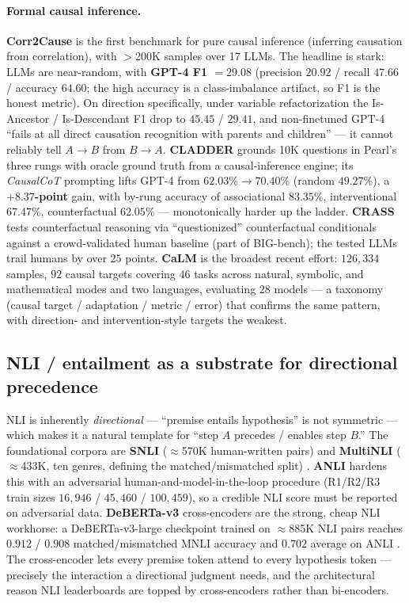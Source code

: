 \paragraph{Formal causal inference.}
\textbf{Corr2Cause} \citep{caus:jin2024corr2cause} is the first benchmark for
pure causal inference (inferring causation from correlation), with $>$200K
samples over 17 LLMs. The headline is stark: LLMs are near-random, with
\textbf{GPT-4 F1 $=29.08$} (precision $20.92$ / recall $47.66$ / accuracy
$64.60$; the high accuracy is a class-imbalance artifact, so F1 is the honest
metric). On direction specifically, under variable refactorization the
Is-Ancestor / Is-Descendant F1 drop to $45.45$ / $29.41$, and non-finetuned GPT-4
``fails at all direct causation recognition with parents and children'' --- it
cannot reliably tell $A\to B$ from $B\to A$. \textbf{CLADDER}
\citep{caus:jin2023cladder} grounds 10K questions in Pearl's three rungs with
oracle ground truth from a causal-inference engine; its \emph{CausalCoT}
prompting lifts GPT-4 from $62.03\%\to70.40\%$ (random $49.27\%$), a
\textbf{$+8.37$-point} gain, with by-rung accuracy of associational $83.35\%$,
interventional $67.47\%$, counterfactual $62.05\%$ --- monotonically harder up
the ladder. \textbf{CRASS} \citep{caus:frohberg2022crass} tests counterfactual
reasoning via ``questionized'' counterfactual conditionals against a
crowd-validated human baseline (part of BIG-bench); the tested LLMs trail humans
by over $25$ points. \textbf{CaLM} \citep{caus:chen2024calm} is the broadest
recent effort: $126{,}334$ samples, $92$ causal targets covering $46$ tasks
across natural, symbolic, and mathematical modes and two languages, evaluating
$28$ models --- a taxonomy (causal target / adaptation / metric / error) that
confirms the same pattern, with direction- and intervention-style targets the
weakest.

\subsection{NLI / entailment as a substrate for directional precedence}
\label{sec:nli}

NLI is inherently \emph{directional} --- ``premise entails hypothesis'' is not
symmetric --- which makes it a natural template for ``step $A$ precedes /
enables step $B$.'' The foundational corpora are \textbf{SNLI} ($\approx$570K
human-written pairs) \citep{found:bowman2015snli} and \textbf{MultiNLI} ($\approx$433K,
ten genres, defining the matched/mismatched split) \citep{found:williams2018mnli}.
\textbf{ANLI} \citep{caus:nie2020anli} hardens this with an adversarial
human-and-model-in-the-loop procedure (R1/R2/R3 train sizes
$16{,}946$ / $45{,}460$ / $100{,}459$), so a credible NLI score must be reported
on adversarial data. \textbf{DeBERTa-v3} cross-encoders are the strong, cheap
NLI workhorse: a DeBERTa-v3-large checkpoint trained on $\approx$885K NLI pairs
reaches $0.912$ / $0.908$ matched/mismatched MNLI accuracy and $0.702$ average on
ANLI \citep{caus:laurer2022debertanli,found:he2021debertav3}. The cross-encoder
lets every premise token attend to every hypothesis token --- precisely the
interaction a directional judgment needs, and the architectural reason NLI
leaderboards are topped by cross-encoders rather than bi-encoders.

